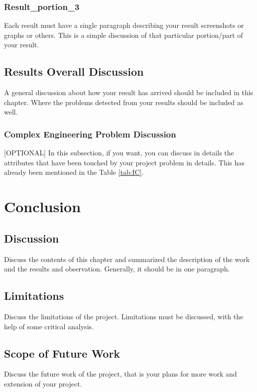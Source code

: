 \documentclass[12pt]{report}
\begin{document}
\subsection{Result\_portion\_3}
Each result must have a single paragraph describing your result screenshots or graphs or others. This is a simple discussion of that particular portion/part of your result.

\section{Results Overall Discussion}
A general discussion about how your result has arrived should be included in this chapter. Where the problems detected from your results should be included as well.

\subsection{Complex Engineering Problem Discussion}
[OPTIONAL] In this subsection, if you want, you can discuss in details the attributes that have been touched by your project problem in details. This has already been mentioned in the Table \ref{tab:IC}.






\newpage
\chapter{Conclusion}

\section{Discussion}
Discuss the contents of this chapter and summarized the description of the work and the results and observation. Generally, it should be in one paragraph.


\section{Limitations}
Discuss the limitations of the project. Limitations must be discussed, with the help of some critical analysis.

\section{Scope of Future Work}
Discuss the future work of the project, that is your plans for more work and extension of your project.





\newpage
  \renewcommand\bibname{References}
  
  
\end{document}
